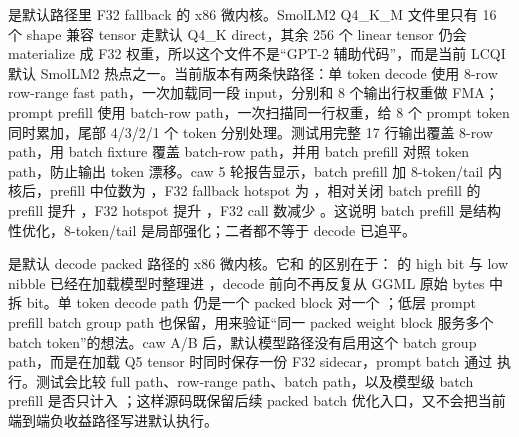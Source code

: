 

 是默认路径里 F32 fallback 的 x86 微内核。SmolLM2 Q4\_K\_M 文件里只有 16 个 shape 兼容 tensor 走默认 Q4\_K direct，其余 256 个 linear tensor 仍会 materialize 成 F32 权重，所以这个文件不是“GPT-2 辅助代码”，而是当前 LCQI 默认 SmolLM2 热点之一。当前版本有两条快路径：单 token decode 使用 8-row row-range fast path，一次加载同一段 input，分别和 8 个输出行权重做 FMA；prompt prefill 使用 batch-row path，一次扫描同一行权重，给 8 个 prompt token 同时累加，尾部 4/3/2/1 个 token 分别处理。测试用完整 17 行输出覆盖 8-row path，用 batch fixture 覆盖 batch-row path，并用 batch prefill 对照 token path，防止输出 token 漂移。caw 5 轮报告显示，batch prefill 加 8-token/tail 内核后，prefill 中位数为 ，F32 fallback hotspot 为 ，相对关闭 batch prefill 的 prefill 提升 ，F32 hotspot 提升 ，F32 call 数减少 。这说明 batch prefill 是结构性优化，8-token/tail 是局部强化；二者都不等于 decode 已追平。



 是默认  decode packed 路径的 x86 微内核。它和  的区别在于： 的 high bit 与 low nibble 已经在加载模型时整理进 ，decode 前向不再反复从 GGML 原始 bytes 中拆 bit。单 token decode path 仍是一个 packed block 对一个 ；低层 prompt prefill batch group path 也保留，用来验证“同一 packed weight block 服务多个 batch token”的想法。caw A/B 后，默认模型路径没有启用这个 batch group path，而是在加载 Q5 tensor 时同时保存一份 F32 sidecar，prompt batch 通过  执行。测试会比较 full path、row-range path、batch path，以及模型级 batch prefill 是否只计入 ；这样源码既保留后续 packed batch 优化入口，又不会把当前端到端负收益路径写进默认执行。



